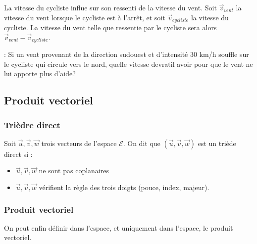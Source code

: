 \documentclass[letterpaper,10pt,english]{jupyterBook}
\begin{document}
\sphinxAtStartPar
{} La vitesse du cycliste influe sur son ressenti de la vitesse du vent. Soit \(\vec{v}_{vent}\) la vitesse du vent lorsque le cycliste est à l’arrêt, et soit \(\vec{v}_{cycliste}\) la vitesse du cycliste. La vitesse du vent telle que ressentie par le cycliste sera alors \(\vec{v}_{vent}-\vec{v}_{cycliste}\).

\sphinxAtStartPar
{}: Si un vent provenant de la direction sud\sphinxhyphen{}ouest et d’intensité 30 km/h souffle sur le cycliste qui circule vers le nord, quelle vitesse devra\sphinxhyphen{}t\sphinxhyphen{}il avoir pour que le vent ne lui apporte plus d’aide?


\subsection{Produit vectoriel}
\label{\detokenize{Part1/Cours:produit-vectoriel}}

\subsubsection{Trièdre direct}
\label{\detokenize{Part1/Cours:triedre-direct}}
\sphinxAtStartPar
Soit \(\vec{u},\vec{v},\vec{w}\)  trois vecteurs de l’espace \(\mathcal{E}\). On dit que \((\vec{u},\vec{v},\vec{w})\) est un triède direct si :
\begin{itemize}
\item {} 
\sphinxAtStartPar
\(\vec{u},\vec{v},\vec{w}\) ne sont pas coplanaires

\item {} 
\sphinxAtStartPar
\(\vec{u},\vec{v},\vec{w}\) vérifient la règle des trois doigts (pouce, index, majeur).

\end{itemize}


\subsubsection{Produit vectoriel}
\label{\detokenize{Part1/Cours:id1}}
\sphinxAtStartPar
On peut enfin définir dans l’espace, et uniquement dans l’espace, le produit vectoriel.

\sphinxAtStartPar
{}
\end{document}
